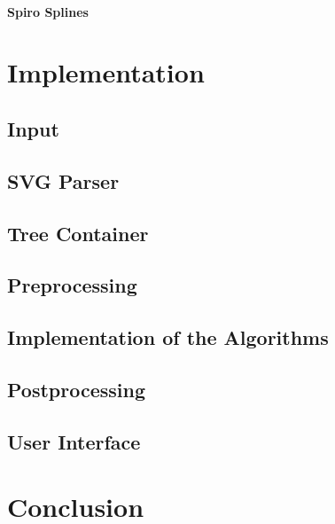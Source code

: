 \documentclass[10pt,twoside,a4paper]{report}
\begin{document}
\subsubsection{Spiro Splines}

\chapter{Implementation}
\section{Input}	%
\section{SVG Parser}
\section{Tree Container}
\section{Preprocessing}
\section{Implementation of the Algorithms}
\section{Postprocessing}
\section{User Interface}

\chapter{Conclusion}
\cleardoublepage

\appendix

\cleardoublepage



\end{document}
